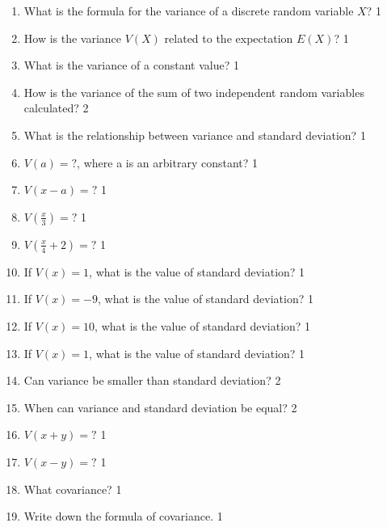 \documentclass[a4paper,oneside, margin=1.4in]{book}
\begin{document}
\begin{enumerate}
\item What is the formula for the variance of a discrete random variable \( X \)? \hfill 1

\item How is the variance \( V(X) \) related to the expectation \( E(X) \)? \hfill 1

\item What is the variance of a constant value? \hfill 1

\item How is the variance of the sum of two independent random variables calculated? \hfill 2

\item What is the relationship between variance and standard deviation? \hfill 1

\item $V(a) = ?$, where a is an arbitrary constant?  \hfill 1

\item $V(x-a) = ?$  \hfill 1

\item $V(\frac x3) = ?$  \hfill 1

\item $V(\frac x4 + 2) = ?$  \hfill 1

\item If $V(x) = 1$, what is the value of standard deviation? \hfill 1

\item If $V(x) = -9$, what is the value of standard deviation? \hfill 1

\item If $V(x) = 10$, what is the value of standard deviation? \hfill 1

\item If $V(x) = 1$, what is the value of standard deviation? \hfill 1

\item Can variance be smaller than standard deviation? \hfill 2

\item When can variance and standard deviation be equal? \hfill 2

\item $V(x + y)=?$ \hfill 1

\item $V(x - y)=?$ \hfill 1

\item What covariance? \hfill 1

\item Write down the formula of covariance. \hfill 1


\end{enumerate}
\end{document}

